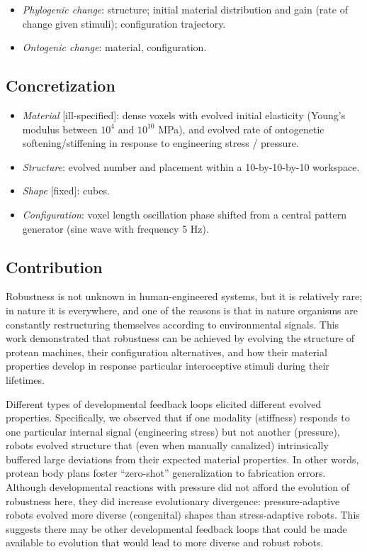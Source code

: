 \begin{itemize}
    \item \textit{Phylogenic change}: structure; initial material distribution and gain (rate of change given stimuli); configuration trajectory.
    \item \textit{Ontogenic change}: material, configuration.
\end{itemize}


\subsection{Concretization}


\begin{itemize}
    \item \textit{Material} [ill-specified]: dense voxels with evolved initial elasticity (Young's modulus between $10^4$ and $10^{10}$ MPa), and evolved rate of ontogenetic softening/stiffening in response to engineering stress / pressure.
    \item \textit{Structure}: evolved number and placement within a 10-by-10-by-10 workspace.
    \item \textit{Shape} [fixed]: cubes.
    \item \textit{Configuration}: voxel length oscillation phase shifted from a central pattern generator (sine wave with frequency 5 Hz).
\end{itemize}



\subsection{Contribution}


Robustness is not unknown in human-engineered systems, but it is relatively rare; in nature it is everywhere, and one of the reasons is that in nature organisms are constantly restructuring themselves according to environmental signals.
This work demonstrated that robustness can be achieved by evolving the structure of protean machines, their configuration alternatives, and how
their material properties develop in response particular interoceptive stimuli during their lifetimes.

Different types of developmental feedback loops elicited different evolved properties.
Specifically, we observed that if one modality (stiffness) responds to one particular internal signal (engineering stress) but not another (pressure), robots evolved structure that (even when manually canalized) intrinsically buffered large deviations from their expected material properties.
In other words, protean body plans foster ``zero-shot'' generalization to fabrication errors.
Although developmental reactions with pressure did not afford the evolution of robustness here, they did increase evolutionary divergence: 
pressure-adaptive robots evolved more diverse 
(congenital) 
shapes than stress-adaptive robots.
This suggests
there may be other developmental feedback loops that could be made available to evolution
that would lead to more diverse and robust robots.





